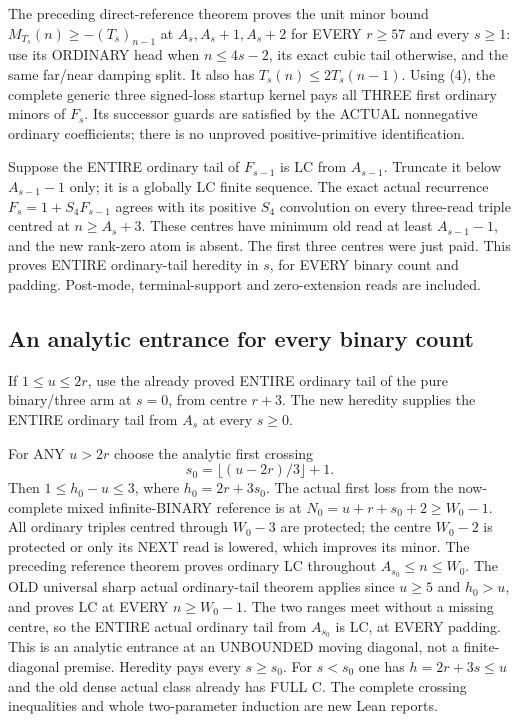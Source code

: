 The preceding direct-reference theorem proves the unit minor
bound $M_{T_s}(n)\ge-(T_s)_{n-1}$ at $A_s,A_s+1,A_s+2$
for EVERY $r\ge57$ and every $s\ge1$: use its ORDINARY head
when $n\le4s-2$, its exact cubic tail otherwise, and the same
far/near damping split. It also has $T_s(n)\le2T_s(n-1)$.
Using (4), the complete generic three signed-loss startup kernel
pays all THREE first ordinary minors of $F_s$. Its successor
guards are satisfied by the ACTUAL nonnegative ordinary coefficients;
there is no unproved positive-primitive identification.

Suppose the ENTIRE ordinary tail of $F_{s-1}$ is LC from $A_{s-1}$.
Truncate it below $A_{s-1}-1$ only; it is a globally LC finite
sequence. The exact actual recurrence $F_s=1+S_4F_{s-1}$ agrees
with its positive $S_4$ convolution on every three-read triple
centred at $n\ge A_s+3$. These centres have minimum old read
at least $A_{s-1}-1$, and the new rank-zero atom is absent.
The first three centres were just paid. This proves ENTIRE
ordinary-tail heredity in $s$, for EVERY binary count and padding.
Post-mode, terminal-support and zero-extension reads are included.

\subsection{An analytic entrance for every binary count}
If $1\le u\le2r$, use the already proved ENTIRE ordinary tail
of the pure binary/three arm at $s=0$, from centre $r+3$.
The new heredity supplies the ENTIRE ordinary tail from $A_s$
at every $s\ge0$.

For ANY $u>2r$ choose the analytic first crossing
\[
                         s_0=\lfloor(u-2r)/3\rfloor+1.              \tag{5}
\]
Then $1\le h_0-u\le3$, where $h_0=2r+3s_0$.
The actual first loss from the now-complete mixed infinite-BINARY
reference is at $N_0=u+r+s_0+2\ge W_0-1$.
All ordinary triples centred through $W_0-3$ are protected;
the centre $W_0-2$ is protected or only its NEXT read is lowered,
which improves its minor. The preceding reference theorem proves
ordinary LC throughout $A_{s_0}\le n\le W_0$.
The OLD universal sharp actual ordinary-tail theorem applies since
$u\ge5$ and $h_0>u$, and proves LC at EVERY $n\ge W_0-1$.
The two ranges meet without a missing centre, so the ENTIRE
actual ordinary tail from $A_{s_0}$ is LC, at EVERY padding.
This is an analytic entrance at an UNBOUNDED moving diagonal,
not a finite-diagonal premise. Heredity pays every $s\ge s_0$.
For $s<s_0$ one has $h=2r+3s\le u$ and the old dense actual
class already has FULL C. The complete crossing inequalities
and whole two-parameter induction are new Lean reports.

